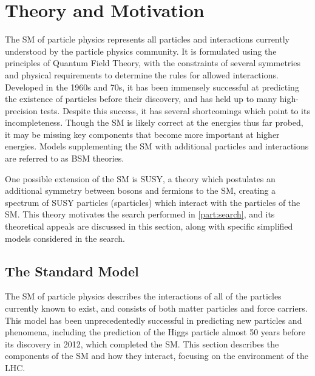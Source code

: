
\chapter{Theory and Motivation} %

\label{ch:theory} %
The \acf{SM} of particle physics represents all particles and interactions currently understood by the particle physics community. It is formulated using the principles of Quantum Field Theory, with the constraints of several symmetries and physical requirements to determine the rules for allowed interactions. \cite{Burgess:2007zi} Developed in the 1960s and 70s, it has been immensely successful at predicting the existence of particles before their discovery, and has held up to many high-precision tests. Despite this success, it has several shortcomings which point to its incompleteness. Though the \ac{SM} is likely correct at the energies thus far probed, it may be missing key components that become more important at higher energies. Models supplementing the \ac{SM} with additional particles and interactions are referred to as \ac{BSM} theories. 

One possible extension of the \ac{SM} is \ac{SUSY}, a theory which postulates an additional symmetry between bosons and fermions to the \ac{SM}, creating a spectrum of \ac{SUSY} particles (sparticles) which interact with the particles of the \ac{SM}. This theory motivates the search performed in \autoref{part:search}, and its theoretical appeals are discussed in this section, along with specific simplified models considered in the search. 


\section{The Standard Model}
\label{sec:standard_model}
The \ac{SM} of particle physics describes the interactions of all of the particles currently known to exist, and consists of both matter particles and force carriers. This model has been unprecedentedly successful in predicting new particles and phenomena, including the prediction of the Higgs particle almost 50 years before its discovery in 2012, which completed the \ac{SM}. This section describes the components of the \ac{SM} and how they interact, focusing on the environment of the \ac{LHC}. 

